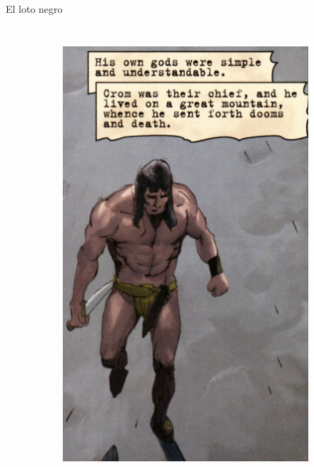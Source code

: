 \begin{frame}{El loto negro}
\begin{columns}
\begin{figure}[htp]
\begin{subfigure}[b]{0.27\textwidth}
				\includegraphics[width=\textwidth]{img/conan/DH}
			\end{subfigure}
			~
			\begin{subfigure}[b]{0.23\textwidth}

\end{subfigure}
\end{figure}
\end{columns}
\end{frame}
